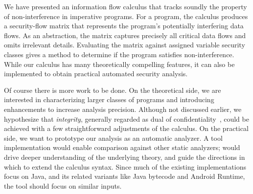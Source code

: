 \documentclass[conference]{IEEEtran}
\begin{document}
We have presented an information flow calculus that tracks soundly the property of non-interference in imperative programs.
For a program, the calculus produces a security-flow matrix that represents the program's potentially interfering data flows.
As an abstraction, the matrix captures precisely all critical data flows and omits irrelevant details.
Evaluating the matrix against assigned variable security classes gives a method to determine if the program satisfies non-interference.
While our calculus has many theoretically compelling features, it can also be implemented to obtain practical automated security analysis.

Of course there is more work to be done.
On the theoretical side, we are interested in characterizing larger classes of programs and introducing enhancements to increase analysis precision.
Although not discussed earlier, we hypothesize that \emph{integrity}, generally regarded as dual of confidentiality~\cite{biba1977}, could be achieved
with a few straightforward adjustments of the calculus.
On the practical side, we want to prototype our analysis as an automatic analyzer.
A tool implementation would enable comparison against other static analyzers; would drive deeper understanding of the underlying theory, and guide the directions in which to extend the calculus syntax.
Since much of the existing implementations focus on Java, and its related variants like Java bytecode and Android Runtime, the tool should focus on similar inputs.
\printbibliography
\end{document}
